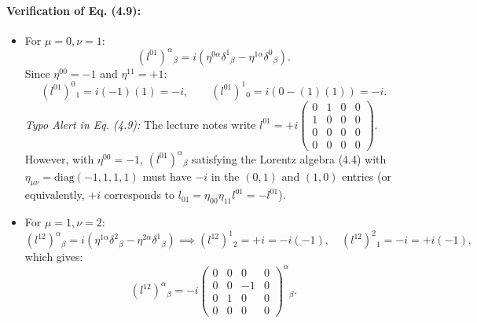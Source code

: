 \documentclass[11pt,a4paper]{article}
\begin{document}
\paragraph{Verification of Eq. (4.9):}
\begin{itemize}
    \item For $\mu=0, \nu=1$:
    \begin{equation}
        (l^{01})^\alpha{}_\beta = i\left(\eta^{0\alpha}\delta^1{}_\beta - \eta^{1\alpha}\delta^0{}_\beta\right).
    \end{equation}
    Since $\eta^{00} = -1$ and $\eta^{11} = +1$:
    \begin{equation}
        (l^{01})^0{}_1 = i(-1)(1) = -i, \qquad (l^{01})^1{}_0 = i(0 - (1)(1)) = -i.
    \end{equation}
    \emph{Typo Alert in Eq. (4.9):} The lecture notes write $l^{01} = +i\begin{pmatrix} 0 & 1 & 0 & 0 \\ 1 & 0 & 0 & 0 \\ 0 & 0 & 0 & 0 \\ 0 & 0 & 0 & 0 \end{pmatrix}$. However, with $\eta^{00}=-1$, $(l^{01})^\alpha{}_\beta$ satisfying the Lorentz algebra (4.4) with $\eta_{\mu\nu}=\mathrm{diag}(-1,1,1,1)$ must have $-i$ in the $(0,1)$ and $(1,0)$ entries (or equivalently, $+i$ corresponds to $l_{01} = \eta_{00}\eta_{11}l^{01} = -l^{01}$).
    \item For $\mu=1, \nu=2$:
    \begin{equation}
        (l^{12})^\alpha{}_\beta = i\left(\eta^{1\alpha}\delta^2{}_\beta - \eta^{2\alpha}\delta^1{}_\beta\right) \implies (l^{12})^1{}_2 = +i = -i(-1), \quad (l^{12})^2{}_1 = -i = +i(-1),
    \end{equation}
    which gives:
    \begin{equation}
        (l^{12})^\alpha{}_\beta = -i\begin{pmatrix} 0 & 0 & 0 & 0 \\ 0 & 0 & -1 & 0 \\ 0 & 1 & 0 & 0 \\ 0 & 0 & 0 & 0 \end{pmatrix}^\alpha{}_\beta.
    \end{equation}
\end{itemize}
\end{document}
